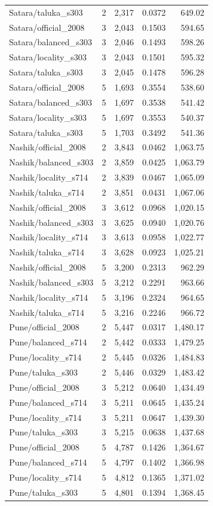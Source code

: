 \documentclass[11pt,a4paper,oneside]{report}
\begin{document}
\begin{center}
\begin{longtable}{p{6cm}rrrr}
Satara/taluka\_s303 & 2 & 2,317 & 0.0372 & 649.02\\
Satara/official\_2008 & 3 & 2,043 & 0.1503 & 594.65\\
Satara/balanced\_s303 & 3 & 2,046 & 0.1493 & 598.26\\
Satara/locality\_s303 & 3 & 2,043 & 0.1501 & 595.32\\
Satara/taluka\_s303 & 3 & 2,045 & 0.1478 & 596.28\\
Satara/official\_2008 & 5 & 1,693 & 0.3554 & 538.60\\
Satara/balanced\_s303 & 5 & 1,697 & 0.3538 & 541.42\\
Satara/locality\_s303 & 5 & 1,697 & 0.3553 & 540.37\\
Satara/taluka\_s303 & 5 & 1,703 & 0.3492 & 541.36\\
Nashik/official\_2008 & 2 & 3,843 & 0.0462 & 1,063.75\\
Nashik/balanced\_s303 & 2 & 3,859 & 0.0425 & 1,063.79\\
Nashik/locality\_s714 & 2 & 3,839 & 0.0467 & 1,065.09\\
Nashik/taluka\_s714 & 2 & 3,851 & 0.0431 & 1,067.06\\
Nashik/official\_2008 & 3 & 3,612 & 0.0968 & 1,020.15\\
Nashik/balanced\_s303 & 3 & 3,625 & 0.0940 & 1,020.76\\
Nashik/locality\_s714 & 3 & 3,613 & 0.0958 & 1,022.77\\
Nashik/taluka\_s714 & 3 & 3,628 & 0.0923 & 1,025.21\\
Nashik/official\_2008 & 5 & 3,200 & 0.2313 & 962.29\\
Nashik/balanced\_s303 & 5 & 3,212 & 0.2291 & 963.66\\
Nashik/locality\_s714 & 5 & 3,196 & 0.2324 & 964.65\\
Nashik/taluka\_s714 & 5 & 3,216 & 0.2246 & 966.72\\
Pune/official\_2008 & 2 & 5,447 & 0.0317 & 1,480.17\\
Pune/balanced\_s714 & 2 & 5,442 & 0.0333 & 1,479.25\\
Pune/locality\_s714 & 2 & 5,445 & 0.0326 & 1,484.83\\
Pune/taluka\_s303 & 2 & 5,446 & 0.0329 & 1,483.42\\
Pune/official\_2008 & 3 & 5,212 & 0.0640 & 1,434.49\\
Pune/balanced\_s714 & 3 & 5,211 & 0.0645 & 1,435.24\\
Pune/locality\_s714 & 3 & 5,211 & 0.0647 & 1,439.30\\
Pune/taluka\_s303 & 3 & 5,215 & 0.0638 & 1,437.68\\
Pune/official\_2008 & 5 & 4,787 & 0.1426 & 1,364.67\\
Pune/balanced\_s714 & 5 & 4,797 & 0.1402 & 1,366.98\\
Pune/locality\_s714 & 5 & 4,812 & 0.1365 & 1,371.02\\
Pune/taluka\_s303 & 5 & 4,801 & 0.1394 & 1,368.45\\
\end{longtable}
\end{center}
\end{document}
